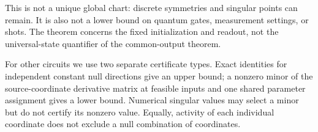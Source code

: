 This is not a unique global chart: discrete symmetries and singular
points can remain. It is also not a lower bound on quantum gates,
measurement settings, or shots. The theorem concerns the fixed
initialization and readout, not the universal-state quantifier of the
common-output theorem.

For other circuits we use two separate certificate types. Exact
identities for independent constant null directions give an upper bound;
a nonzero minor of the source-coordinate derivative matrix at feasible
inputs and one shared parameter assignment gives a lower bound.
Numerical singular values may select a minor but do not certify its
nonzero value. Equally, activity of each individual coordinate does not
exclude a null combination of coordinates.
